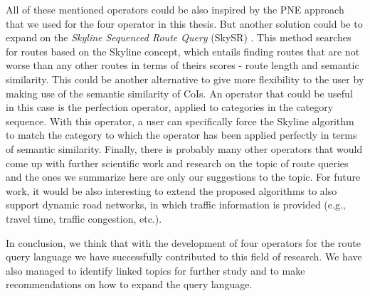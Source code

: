 All of these mentioned operators could be also inspired by the PNE approach that we used for the four operator in this thesis. But another solution could be to expand on the \textit{Skyline Sequenced Route Query} (SkySR) \cite{skyline}. This method searches for routes based on the Skyline concept, which entails finding routes that are not worse than any other routes in terms of theirs scores - route length and semantic similarity. This could be another alternative to give more flexibility to the user by making use of the semantic similarity of CoIs. An operator that could be useful in this case is the perfection operator, applied to categories in the category sequence. With this operator, a user can specifically force the Skyline algorithm to match the category to which the operator has been applied perfectly in terms of semantic similarity. Finally, there is probably many other operators that would come up with further scientific work and research on the topic of route queries and the ones we summarize here are only our suggestions to the topic. For future work, it would be also interesting to extend the proposed algorithms to also support dynamic road networks, in which traffic information is provided (e.g., travel time, traffic congestion, etc.).

In conclusion, we think that with the development of four operators for the route query language we have successfully contributed to this field of research. We have also managed to identify linked topics for further study and to make recommendations on how to expand the query language. 

\pagebreak
